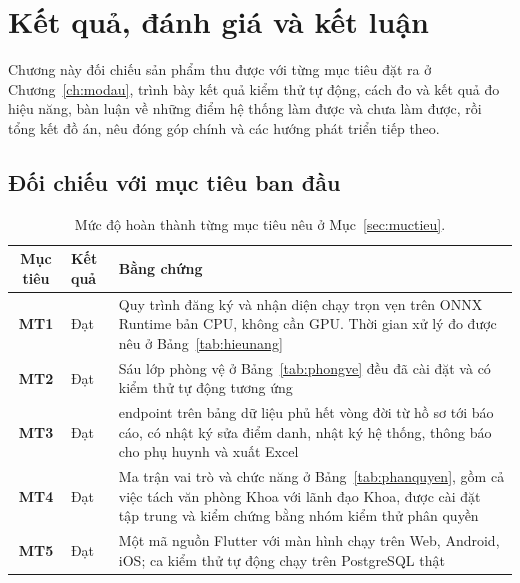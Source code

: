 \chapter{Kết quả, đánh giá và kết luận}
\label{ch:ketqua}

\begin{muctieu}
Chương này đối chiếu sản phẩm thu được với từng mục tiêu đặt ra ở
Chương~\ref{ch:modau}, trình bày kết quả kiểm thử tự động, cách đo và kết
quả đo hiệu năng, bàn luận về những điểm hệ
thống làm được và chưa làm được, rồi tổng kết đồ án, nêu đóng góp chính và
các hướng phát triển tiếp theo.
\end{muctieu}

\section{Đối chiếu với mục tiêu ban đầu}

\begin{table}[H]
\centering
\caption{Mức độ hoàn thành từng mục tiêu nêu ở Mục~\ref{sec:muctieu}.}
\label{tab:doichieumuctieu}
\small
\begin{tabularx}{\textwidth}{@{}>{\bfseries}c >{\raggedright\arraybackslash}p{2.2cm} X@{}}
\toprule
Mục tiêu & Kết quả & Bằng chứng \\
\midrule
MT1 & Đạt & Quy trình đăng ký và nhận diện chạy trọn vẹn trên ONNX Runtime
  bản CPU, không cần GPU. Thời gian xử lý đo được nêu ở
  Bảng~\ref{tab:hieunang} \\
MT2 & Đạt & Sáu lớp phòng vệ ở Bảng~\ref{tab:phongve} đều đã cài đặt và có
  kiểm thử tự động tương ứng \\
MT3 & Đạt & \FsoEndpoint{} endpoint trên \FsoBang{} bảng dữ liệu phủ hết
  vòng đời từ hồ sơ tới báo cáo, có nhật ký sửa điểm danh, nhật ký hệ thống,
  thông báo cho phụ huynh và xuất Excel \\
MT4 & Đạt & Ma trận vai trò và chức năng ở Bảng~\ref{tab:phanquyen}, gồm cả
  việc tách văn phòng Khoa với lãnh đạo Khoa, được cài đặt tập trung và kiểm
  chứng bằng nhóm kiểm thử phân quyền \\
MT5 & Đạt & Một mã nguồn Flutter với \FsoManHinh{} màn hình chạy trên Web,
  Android, iOS; \FsoTest{} ca kiểm thử tự động chạy trên PostgreSQL thật \\
\bottomrule
\end{tabularx}
\end{table}

